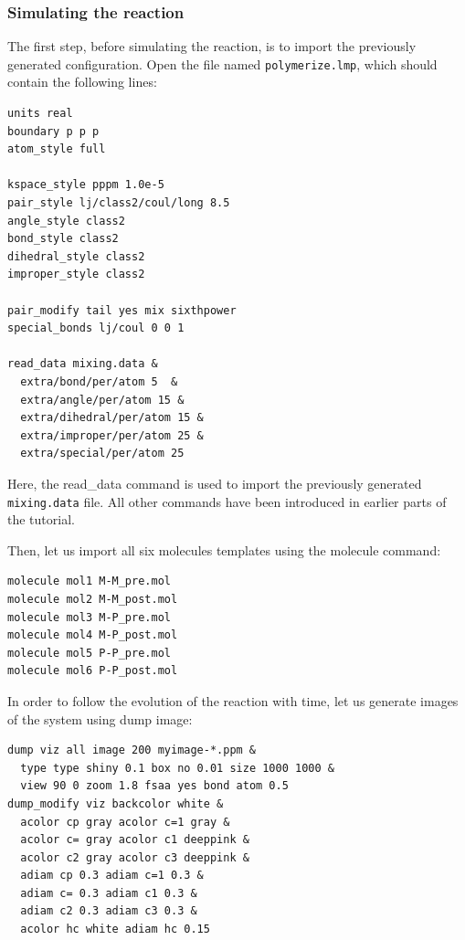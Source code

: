 \documentclass[9pt,tutorial]{livecoms}
\newcommand{\lmpcmd}[1]{\colorbox{listing}{\textcolor{command}{\small{#1}}}} %
\newcommand{\flecmd}[1]{\textcolor{command}{\texttt{#1}}} %
\begin{document}
\subsubsection{Simulating the reaction}

The first step, before simulating the reaction, is to import the previously
generated configuration.  Open the file named \flecmd{polymerize.lmp},
which should contain the following lines:
\begin{lstlisting}
units real
boundary p p p
atom_style full

kspace_style pppm 1.0e-5
pair_style lj/class2/coul/long 8.5
angle_style class2
bond_style class2
dihedral_style class2
improper_style class2

pair_modify tail yes mix sixthpower
special_bonds lj/coul 0 0 1

read_data mixing.data &
  extra/bond/per/atom 5  &
  extra/angle/per/atom 15 &
  extra/dihedral/per/atom 15 &
  extra/improper/per/atom 25 &
  extra/special/per/atom 25
\end{lstlisting}
Here, the \lmpcmd{read\_data} command is used to import the
previously generated \flecmd{mixing.data} file.  All other commands
have been introduced in earlier parts of the tutorial.

Then, let us import all six molecules templates using the \lmpcmd{molecule} command:
\begin{lstlisting}
molecule mol1 M-M_pre.mol
molecule mol2 M-M_post.mol
molecule mol3 M-P_pre.mol
molecule mol4 M-P_post.mol
molecule mol5 P-P_pre.mol
molecule mol6 P-P_post.mol
\end{lstlisting}
In order to follow the evolution of the reaction with time, let us generate images
of the system using \lmpcmd{dump image}:
\begin{lstlisting}
dump viz all image 200 myimage-*.ppm &
  type type shiny 0.1 box no 0.01 size 1000 1000 &
  view 90 0 zoom 1.8 fsaa yes bond atom 0.5
dump_modify viz backcolor white &
  acolor cp gray acolor c=1 gray &
  acolor c= gray acolor c1 deeppink &
  acolor c2 gray acolor c3 deeppink &
  adiam cp 0.3 adiam c=1 0.3 &
  adiam c= 0.3 adiam c1 0.3 &
  adiam c2 0.3 adiam c3 0.3 &
  acolor hc white adiam hc 0.15
\end{lstlisting}
\end{document}
